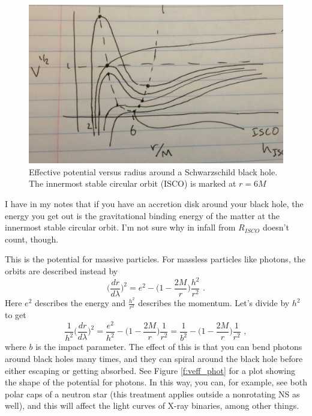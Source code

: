 \begin{figure}[!h]
\begin{center}
\includegraphics[width=\textwidth]{veff.jpg}
\caption{Effective potential versus radius around a Schwarzschild black hole. The innermost stable circular orbit (ISCO) is marked at $r = 6M$ \label{f:veff}}
\end{center}
\end{figure}

I have in my notes that if you have an accretion disk around your black hole, the energy you get out is the gravitational binding energy of the matter at the innermost stable circular orbit. I'm not sure why in infall from $R_{ISCO}$ doesn't count, though.


This is the potential for massive particles. For massless particles like photons, the orbits are described instead by
\begin{equation}
\biggl(\frac{dr}{d\lambda} \biggr)^2 = e^2 - \biggl( 1 - \frac{2M}{r} \biggr)  \frac{h^2}{r^2}\,\,.
\end{equation}
Here $e^2$ describes the energy and $\frac{h^2}{r^2}$ describes the momentum. Let's divide by $h^2$ to get
\begin{equation}
\frac{1}{h^2} \biggl( \frac{dr}{d\lambda} \biggr)^2 = \frac{e^2}{h^2} - \biggl( 1 - \frac{2M}{r} \biggr) \frac{1}{r^2} = \frac{1}{b^2} - \biggl( 1 - \frac{2M}{r} \biggr) \frac{1}{r^2}\,\, ,
\end{equation}
where $b$ is the impact parameter. The effect of this is that you can bend photons around black holes many times, and they can spiral around the black hole before either escaping or getting absorbed. See Figure \ref{f:veff_phot} for a plot showing the shape of the potential for photons. In this way, you can, for example, see both polar caps of a neutron star (this treatment applies outside a nonrotating NS as well), and this will affect the light curves of X-ray binaries, among other things.

